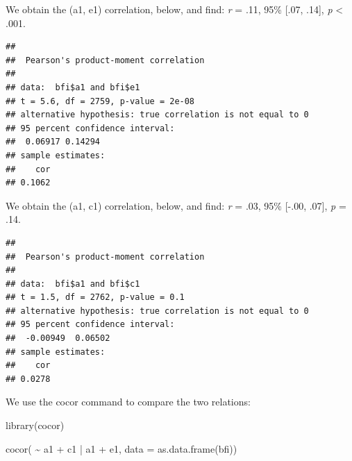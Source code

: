 \documentclass[
]{krantz}
\makeatletter
\newenvironment{Shaded}{\begin{snugshade}}{\end{snugshade}}
\newcommand{\AttributeTok}[1]{\textcolor[rgb]{0.61,0.61,0.61}{#1}}
\newcommand{\FunctionTok}[1]{\textcolor[rgb]{0,0,0}{#1}}
\newcommand{\NormalTok}[1]{#1}
\newcommand{\SpecialCharTok}[1]{\textcolor[rgb]{0,0,0}{#1}}
\newenvironment{kframe}{%
\medskip{}
\setlength{\fboxsep}{.8em}
 \def\at@end@of@kframe{}%
 \ifinner\ifhmode%
  \def\at@end@of@kframe{\end{minipage}}%
  \begin{minipage}{\columnwidth}%
 \fi\fi%
 \def\FrameCommand##1{\hskip\@totalleftmargin \hskip-\fboxsep
 \colorbox{shadecolor}{##1}\hskip-\fboxsep
     \hskip-\linewidth \hskip-\@totalleftmargin \hskip\columnwidth}%
 \MakeFramed {\advance\hsize-\width
   \@totalleftmargin\z@ \linewidth\hsize
   \@setminipage}}%
 {\par\unskip\endMakeFramed%
 \at@end@of@kframe}
\renewenvironment{Shaded}{\begin{kframe}}{\end{kframe}}
\makeatother
\begin{document}
We obtain the (a1, e1) correlation, below, and find: \emph{r} = .11, 95\% {[}.07, .14{]}, \emph{p} \textless{} .001.

\begin{Shaded}
\end{Shaded}

\begin{verbatim}
## 
##  Pearson's product-moment correlation
## 
## data:  bfi$a1 and bfi$e1
## t = 5.6, df = 2759, p-value = 2e-08
## alternative hypothesis: true correlation is not equal to 0
## 95 percent confidence interval:
##  0.06917 0.14294
## sample estimates:
##    cor 
## 0.1062
\end{verbatim}

We obtain the (a1, c1) correlation, below, and find: \emph{r} = .03, 95\% {[}-.00, .07{]}, \emph{p} = .14.

\begin{Shaded}
\end{Shaded}

\begin{verbatim}
## 
##  Pearson's product-moment correlation
## 
## data:  bfi$a1 and bfi$c1
## t = 1.5, df = 2762, p-value = 0.1
## alternative hypothesis: true correlation is not equal to 0
## 95 percent confidence interval:
##  -0.00949  0.06502
## sample estimates:
##    cor 
## 0.0278
\end{verbatim}

We use the cocor command to compare the two relations:

\begin{Shaded}
\begin{Highlighting}[]
\FunctionTok{library}\NormalTok{(cocor)}

\FunctionTok{cocor}\NormalTok{( }\SpecialCharTok{\textasciitilde{}}\NormalTok{ a1 }\SpecialCharTok{+}\NormalTok{ c1 }\SpecialCharTok{|}\NormalTok{ a1 }\SpecialCharTok{+}\NormalTok{ e1, }\AttributeTok{data =} \FunctionTok{as.data.frame}\NormalTok{(bfi))}
\end{Highlighting}
\end{Shaded}
\end{document}
